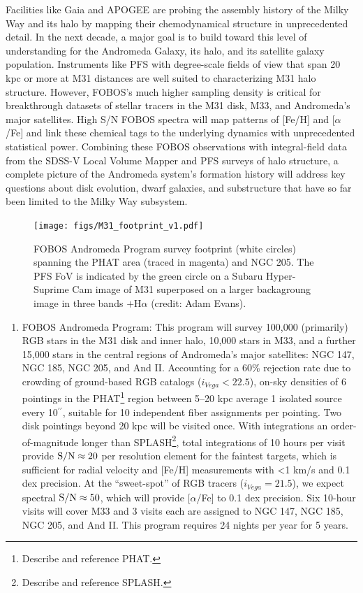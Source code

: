 \documentclass[oneside,11pt]{amsart}
\newcommand{\arcsec}{\mbox{$^{\prime\prime}$}}
\newcounter{chalno}
\newcommand{\chal}[1]{\refstepcounter{chalno}\label{#1}}
\begin{document}
Facilities like Gaia and APOGEE are probing the assembly history of
the Milky Way and its halo by mapping their chemodynamical structure
in unprecedented detail. In the next decade, a major goal is to build
toward this level of understanding for the Andromeda Galaxy, its
halo, and its satellite galaxy population. Instruments like PFS with
degree-scale fields of view that span 20 kpc or more at M31 distances
are well suited to characterizing M31 halo structure. However,
FOBOS's much higher sampling density is critical for breakthrough
datasets of stellar tracers in the M31 disk, M33, and Andromeda's
major satellites. High S/N FOBOS spectra will map patterns of [Fe/H]
and [$\alpha$/Fe] and link these chemical tags to the underlying
dynamics with unprecedented statistical power. Combining these FOBOS
observations with integral-field data from the SDSS-V Local Volume
Mapper and PFS surveys of halo structure, a complete picture of the
Andromeda system's formation history will address key questions about
disk evolution, dwarf galaxies, and substructure that have so far
been limited to the Milky Way subsystem.

\begin{figure}\small
\texttt{[image: figs/M31\_footprint\_v1.pdf]}
\caption{FOBOS Andromeda Program survey footprint (white circles)
spanning the PHAT area (traced in magenta) and NGC 205. The PFS FoV
is indicated by the green circle on a Subaru Hyper-Suprime Cam image
of M31 superposed on a larger backagroung image in three bands
$+$H$\alpha$ (credit: Adam Evans).}
\label{fig:M31}
\end{figure}

\chal{stellar} 
%
\begin{enumerate}[rightmargin=0.2cm,leftmargin=0.2cm]
%
\item[] {\textsf {\large FOBOS Andromeda Program:}} This program will
survey 100,000 (primarily) RGB stars in the M31 disk and inner halo,
10,000 stars in M33, and a further 15,000 stars in the central
regions of Andromeda's major satellites: NGC 147, NGC 185, NGC 205,
and And II. Accounting for a 60\% rejection rate
\citep[see][]{dorman12} due to crowding of ground-based RGB catalogs
($i_{Vega} < 22.5$), on-sky densities of 6 pointings in the
PHAT\footnote{Describe and reference PHAT.} region between 5--20 kpc
average 1 isolated source every 10\arcsec{}, suitable for 10
independent fiber assignments per pointing. Two disk pointings beyond
20 kpc will be visited once. With integrations an order-of-magnitude
longer than SPLASH\footnote{Describe and reference SPLASH.}, total
integrations of 10 hours per visit provide ${\rm S/N} \approx 20$ per
resolution element for the faintest targets, which is sufficient for
radial velocity and [Fe/H] measurements with <1 km/s and 0.1 dex
precision. At the ``sweet-spot'' of RGB tracers ($i_{Vega} = 21.5$),
we expect spectral ${\rm S/N} \approx 50$, which will provide
[$\alpha$/Fe] to 0.1 dex precision. Six 10-hour visits will cover M33
and 3 visits each are assigned to NGC 147, NGC 185, NGC 205, and And
II. This program requires 24 nights per year for 5 years.
%
\end{enumerate}
\end{document}
